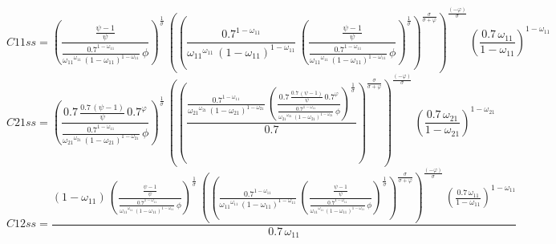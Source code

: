 \begin{dmath*}
C11ss = \left(\frac{\frac{{{\psi}}-1}{{{\psi}}}}{\frac{0.7^{1-{{\omega_{11}}}}}{{{\omega_{11}}}^{{{\omega_{11}}}}\, \left(1-{{\omega_{11}}}\right)^{1-{{\omega_{11}}}}}\, {{\phi}}}\right)^{\frac{1}{{{\sigma}}}}\, \left(\left(\frac{0.7^{1-{{\omega_{11}}}}}{{{\omega_{11}}}^{{{\omega_{11}}}}\, \left(1-{{\omega_{11}}}\right)^{1-{{\omega_{11}}}}}\, \left(\frac{\frac{{{\psi}}-1}{{{\psi}}}}{\frac{0.7^{1-{{\omega_{11}}}}}{{{\omega_{11}}}^{{{\omega_{11}}}}\, \left(1-{{\omega_{11}}}\right)^{1-{{\omega_{11}}}}}\, {{\phi}}}\right)^{\frac{1}{{{\sigma}}}}\right)^{\frac{{{\sigma}}}{{{\sigma}}+{{\varphi}}}}\right)^{\frac{\left(-{{\varphi}}\right)}{{{\sigma}}}}\, \left(\frac{0.7\, {{\omega_{11}}}}{1-{{\omega_{11}}}}\right)^{1-{{\omega_{11}}}}
\end{dmath*}
\begin{dmath*}
C21ss = \left(\frac{0.7\, \frac{0.7\, \left({{\psi}}-1\right)}{{{\psi}}}\, 0.7^{{{\varphi}}}}{\frac{0.7^{1-{{\omega_{11}}}}}{{{\omega_{21}}}^{{{\omega_{21}}}}\, \left(1-{{\omega_{21}}}\right)^{1-{{\omega_{21}}}}}\, {{\phi}}}\right)^{\frac{1}{{{\sigma}}}}\, \left(\left(\frac{\frac{0.7^{1-{{\omega_{11}}}}}{{{\omega_{21}}}^{{{\omega_{21}}}}\, \left(1-{{\omega_{21}}}\right)^{1-{{\omega_{21}}}}}\, \left(\frac{0.7\, \frac{0.7\, \left({{\psi}}-1\right)}{{{\psi}}}\, 0.7^{{{\varphi}}}}{\frac{0.7^{1-{{\omega_{11}}}}}{{{\omega_{21}}}^{{{\omega_{21}}}}\, \left(1-{{\omega_{21}}}\right)^{1-{{\omega_{21}}}}}\, {{\phi}}}\right)^{\frac{1}{{{\sigma}}}}}{0.7}\right)^{\frac{{{\sigma}}}{{{\sigma}}+{{\varphi}}}}\right)^{\frac{\left(-{{\varphi}}\right)}{{{\sigma}}}}\, \left(\frac{0.7\, {{\omega_{21}}}}{1-{{\omega_{21}}}}\right)^{1-{{\omega_{21}}}}
\end{dmath*}
\begin{dmath*}
C12ss = \frac{\left(1-{{\omega_{11}}}\right)\, \left(\frac{\frac{{{\psi}}-1}{{{\psi}}}}{\frac{0.7^{1-{{\omega_{11}}}}}{{{\omega_{11}}}^{{{\omega_{11}}}}\, \left(1-{{\omega_{11}}}\right)^{1-{{\omega_{11}}}}}\, {{\phi}}}\right)^{\frac{1}{{{\sigma}}}}\, \left(\left(\frac{0.7^{1-{{\omega_{11}}}}}{{{\omega_{11}}}^{{{\omega_{11}}}}\, \left(1-{{\omega_{11}}}\right)^{1-{{\omega_{11}}}}}\, \left(\frac{\frac{{{\psi}}-1}{{{\psi}}}}{\frac{0.7^{1-{{\omega_{11}}}}}{{{\omega_{11}}}^{{{\omega_{11}}}}\, \left(1-{{\omega_{11}}}\right)^{1-{{\omega_{11}}}}}\, {{\phi}}}\right)^{\frac{1}{{{\sigma}}}}\right)^{\frac{{{\sigma}}}{{{\sigma}}+{{\varphi}}}}\right)^{\frac{\left(-{{\varphi}}\right)}{{{\sigma}}}}\, \left(\frac{0.7\, {{\omega_{11}}}}{1-{{\omega_{11}}}}\right)^{1-{{\omega_{11}}}}}{0.7\, {{\omega_{11}}}}
\end{dmath*}
